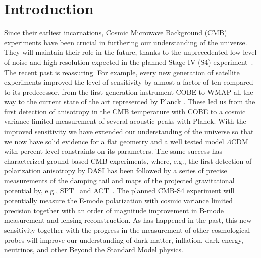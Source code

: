 \documentclass[aps,prd,reprint,superscriptaddress]{revtex4-1}
\begin{document}
\section{Introduction}\label{sec:intro}
Since their earliest incarnations, Cosmic Microwave Background (CMB) experiments have been crucial in furthering our understanding of the universe. They will maintain their role in the future, thanks to the unprecedented low level of noise and high resolution expected in the planned Stage IV (S4) experiment~\cite{2013arXiv1309.5383A}.
The recent past is reassuring. For example, every new generation of satellite experiments improved the level of sensitivity by almost a factor of ten compared to its predecessor, from the first generation instrument COBE to WMAP all the way to the current state of the art represented by Planck \cite{2015arXiv150201589P, planck-collaboration:2014, 2003ApJS..148..175S, 2000ApJ...545L...5H,2000Natur.404..955D}. 
These led us from the first detection of anisotropy in the CMB temperature with COBE to a cosmic variance limited measurement of several acoustic peaks with Planck. With the improved sensitivity we have extended our understanding of the universe so that we now have solid evidence for a flat geometry and a well tested model $\Lambda$CDM with percent level constraints on its parameters.
The same success has characterized ground-based CMB experiments, where, e.g., the first detection of polarization anisotropy by DASI \cite{2002ApJ...568...38H} has been followed by a series of precise measurements of the damping tail and maps of the projected gravitational potential by, e.g., SPT~\cite{2011ApJ...743...28K} and ACT~\cite{2011ApJ...739...52D}.
The planned CMB-S4 experiment will potentially measure the E-mode polarization with cosmic variance limited precision together with an order of magnitude improvement in B-mode measurement and lensing reconstruction. As has happened in the past, this new sensitivity together with the progress in the measurement of other cosmological probes will improve our understanding of dark matter, inflation, dark energy, neutrinos, and other  Beyond the Standard Model physics.
\end{document}
